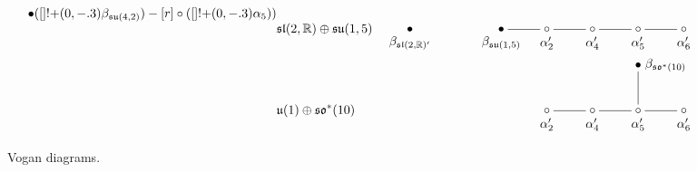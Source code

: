 \documentclass[pdftex]{sigma}
\numberwithin{equation}{section}
\newcommand{\BR}{\mathbb{R}}
\begin{document}
\begin{figure}[t!]
\begin{align*}
{\bullet ([]!{+(0,-.3)} {\beta_{\mathfrak{su}(4,2)}}) - [r]
\circ ([]!{+(0,-.3)} {\alpha_5}))} \\[-1mm]
&\mathfrak{sl}(2,\BR)\oplus\mathfrak{su}(1,5) &\xygraph{ \bullet ([]!{+(0,-.3)} {\beta_{\mathfrak{sl}(2,\BR)'}}) [r] [r]
\bullet ([]!{+(0,-.3)} {\beta_{\mathfrak{su}(1,5)}}) - [r]
\circ ([]!{+(0,-.3)} {\alpha_2'}) - [r]
\circ ([]!{+(0,-.3)} {\alpha_4'}) - [r]
\circ ([]!{+(0,-.3)} {\alpha_5'}) - [r]
\circ ([]!{+(0,-.3)} {\alpha_6'})} \\[-1mm]
&\mathfrak{u}(1)\oplus\mathfrak{so}^*(10) &\xygraph{ \circ ([]!{+(0,-.3)} {\alpha_2'}) - [r]
\circ ([]!{+(0,-.3)} {\alpha_4'}) - [r]
\circ ([]!{+(0,-.3)} {\alpha_5'}) (
- [u] \bullet ([]!{+(.6,0)} {\beta_{\mathfrak{so}^*(10)}}),
- [r] \circ ([]!{+(0,-.3)} {\alpha_6'}))}
\end{align*}
\caption{Vogan diagrams.}\label{Vogan_diag}\vspace{-3mm}
\end{figure}
\end{document}
